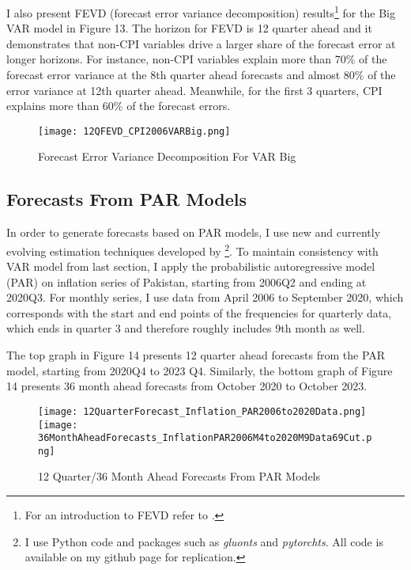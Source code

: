 \documentclass[12pt]{article}
\newcommand{\1}{\mathbbm 1}
\begin{document}
	I also present FEVD (forecast error variance decomposition) results\footnote{For an introduction to FEVD refer to \cite{lutkepohl2010variance}.} for the Big VAR model in Figure 13. The horizon for FEVD is 12 quarter ahead and it demonstrates that non-CPI variables drive a larger share of the forecast error at longer horizons. For instance, non-CPI variables explain more than 70\% of the forecast error variance at the 8th quarter ahead forecasts and almost 80\% of the error variance at 12th quarter ahead. Meanwhile, for the first 3 quarters, CPI explains more than 60\% of the forecast errors.
	
	
		
		\begin{figure}[H]
			\begin{Center}
				\texttt{[image: 12QFEVD\_CPI2006VARBig.png]}
				\caption{Forecast Error Variance Decomposition For VAR Big}
			\end{Center}
		\end{figure}
		
		
		\subsection{Forecasts From PAR Models}
		
		In order to generate forecasts based on PAR models, I use new and currently evolving estimation techniques developed by \cite{gluonts_arxiv}\footnote{I use Python code and packages such as \textit{gluonts} and \textit{pytorchts}. All code is available on my github page for replication.}. To maintain consistency with VAR model from last section, I apply the probabilistic autoregressive model (PAR) on inflation series of Pakistan, starting from 2006Q2 and ending at 2020Q3. For monthly series, I use data from April 2006 to September 2020, which corresponds with the start and end points of the frequencies for quarterly data, which ends in quarter 3 and therefore roughly includes 9th month as well.
		
		The top graph in Figure 14 presents 12 quarter ahead forecasts from the PAR model, starting from 2020Q4 to 2023 Q4. Similarly, the bottom graph of Figure 14 presents 36 month ahead forecasts from October 2020 to October 2023. 
		
			\begin{figure}[H]
			\begin{Center}
				\texttt{[image: 12QuarterForecast\_Inflation\_PAR2006to2020Data.png]}
				\texttt{[image: 36MonthAheadForecasts\_InflationPAR2006M4to2020M9Data69Cut.png]}
				\caption{12 Quarter/36 Month Ahead Forecasts From PAR Models}
			\end{Center}
		\end{figure}
		
\end{document}
